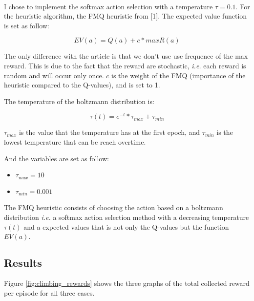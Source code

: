 \documentclass[letterpaper]{article}
\begin{document}
\paragraph{}


I chose to implement the softmax action selection with a temperature
$\tau = 0.1$. For the heuristic algorithm, the FMQ heuristic from
[1]. The expected value function is set as follow:

$$
EV(a) = Q(a) + c * maxR(a)
$$

The only difference with the article is that we don't use use frequence of
the max reward. This is due to the fact that the reward are stochastic,
\textit{i.e.} each reward is random and will occur only once. $c$ is the
weight of the FMQ (importance of the heuristic compared
to the Q-values), and is set to 1.

The temperature of the boltzmann distribution is:

$$
\tau(t) = e^{-t} * \tau_{max} + \tau_{min}
$$

$\tau_{max}$ is the value that the temperature has at the first epoch, and
$\tau_{min}$ is the lowest temperature that can be reach overtime.

And the variables are set as follow:

\begin{itemize}
  \item $\tau_{max} = 10$
  \item $\tau_{min} = 0.001$
\end{itemize}

The FMQ heuristic consists of choosing the action based on a boltzmann
distribution \textit{i.e.} a softmax action selection method with
a decreasing temperature $\tau(t)$ and a expected values that is not only the
Q-values but the function $EV(a)$.

\subsection{Results}

Figure \ref{fig:climbing_rewards} shows the three graphs of the
total collected reward per episode for all three cases.
\end{document}

